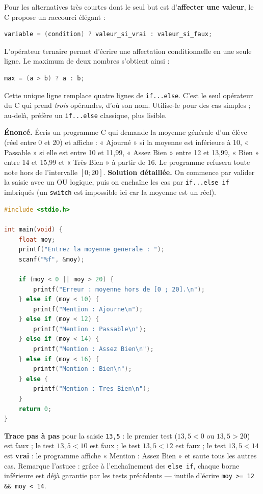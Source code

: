 \documentclass[11pt]{article}
\begin{document}
Pour les alternatives très courtes dont le seul but est d'\textbf{affecter une valeur}, le C propose un raccourci élégant :

\begin{lstlisting}[language=C]
variable = (condition) ? valeur_si_vrai : valeur_si_faux;
\end{lstlisting}

\begin{savaistu}
L'opérateur ternaire permet d'écrire une affectation conditionnelle en une seule ligne. Le maximum de deux nombres s'obtient ainsi :
\begin{lstlisting}[language=C]
max = (a > b) ? a : b;
\end{lstlisting}
Cette unique ligne remplace quatre lignes de \texttt{if...else}. C'est le seul opérateur du C qui prend \emph{trois} opérandes, d'où son nom. Utilise-le pour des cas simples ; au-delà, préfère un \texttt{if...else} classique, plus lisible.
\end{savaistu}

\begin{exoresolu}
\textbf{Énoncé.} Écris un programme C qui demande la moyenne générale d'un élève (réel entre 0 et 20) et affiche : « Ajourné » si la moyenne est inférieure à 10, « Passable » si elle est entre 10 et 11,99, « Assez Bien » entre 12 et 13,99, « Bien » entre 14 et 15,99 et « Très Bien » à partir de 16. Le programme refusera toute note hors de l'intervalle $[0 ; 20]$.
\tcblower
\textbf{Solution détaillée.} On commence par valider la saisie avec un OU logique, puis on enchaîne les cas par \texttt{if...else if} imbriqués (un \texttt{switch} est impossible ici car la moyenne est un réel).
\begin{lstlisting}[language=C]
#include <stdio.h>

int main(void) {
    float moy;
    printf("Entrez la moyenne generale : ");
    scanf("%f", &moy);

    if (moy < 0 || moy > 20) {
        printf("Erreur : moyenne hors de [0 ; 20].\n");
    } else if (moy < 10) {
        printf("Mention : Ajourne\n");
    } else if (moy < 12) {
        printf("Mention : Passable\n");
    } else if (moy < 14) {
        printf("Mention : Assez Bien\n");
    } else if (moy < 16) {
        printf("Mention : Bien\n");
    } else {
        printf("Mention : Tres Bien\n");
    }
    return 0;
}
\end{lstlisting}
\textbf{Trace pas à pas} pour la saisie \texttt{13,5} : le premier test ($13{,}5 < 0$ ou $13{,}5 > 20$) est faux ; le test $13{,}5 < 10$ est faux ; le test $13{,}5 < 12$ est faux ; le test $13{,}5 < 14$ est \textbf{vrai} : le programme affiche « Mention : Assez Bien » et saute tous les autres cas. Remarque l'astuce : grâce à l'enchaînement des \texttt{else if}, chaque borne inférieure est déjà garantie par les tests précédents — inutile d'écrire \texttt{moy >= 12 \&\& moy < 14}.
\end{exoresolu}
\end{document}

